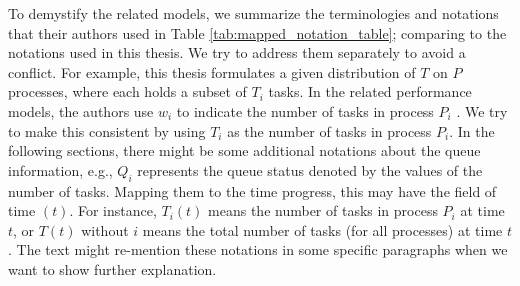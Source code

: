 To demystify the related models, we summarize the terminologies and notations that their authors used in Table \ref{tab:mapped_notation_table}; comparing to the notations used in this thesis. We try to address them separately to avoid a conflict. For example,  this thesis formulates a given distribution of $T$ on $P$ processes, where each holds a subset of $T_{i}$ tasks. In the related performance models, the authors use $w_{i}$ to indicate the number of tasks in process $P_{i}$  \cite{tchiboukdjian2013decentralized}. We try to make this consistent by using $T_{i}$ as the number of tasks in process $P_{i}$. In the following sections, there might be some additional notations about the queue information, e.g., $Q_{i}$ represents the queue status denoted by the values of the number of tasks. Mapping them to the time progress, this may have the field of time $(t)$. For instance, $T_{i}(t)$ means the number of tasks in process $P_{i}$ at time $t$, or $T(t)$ without $i$ means the total number of tasks (for all processes) at time $t$. The text might re-mention these notations in some specific paragraphs when we want to show further explanation.\\

